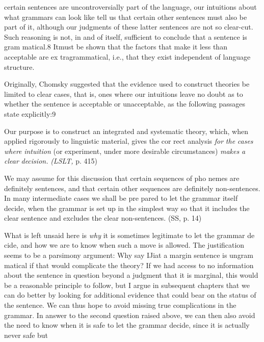 \clearpage\setcounter{page}{1}\begin{styleStandard}
certain sentences are uncontroversially part of the language, our intuitions about what grammars can look like tell us that certain other sentences must also be part of it, although our judgments of these latter sentences are not so clear-cut. Such reasoning is not, in and of itself, sufficient to conclude that a sentence is gram\- matical.8 Itmust be shown that the factors that make it less than acceptable are ex\- tragrammatical, i.e., that they exist independent of language structure.
\end{styleStandard}


\begin{styleStandard}
Originally, Chomsky suggested that the evidence used to construct theories be limited to clear cases, that is, ones where our intuitions leave no doubt as to whether the sentence is acceptable or unacceptable, as the following passages state explicitly:9
\end{styleStandard}


\begin{styleStandard}
Our purpose is to construct an integrated and systematic theory, which, when applied rigorously to linguistic material, gives the cor\- rect analysis \textit{for}\textit{ }\textit{the}\textit{ }\textit{cases}\textit{ }\textit{where}\textit{ }\textit{intuition}\textit{ }(or experiment, under more desirable circumstances) \textit{makes}\textit{ }\textit{a}\textit{ }\textit{clear}\textit{ }\textit{decision.}\textit{ }\textit{(LSLT,}\textit{ }p. 415)
\end{styleStandard}


\begin{styleStandard}
We may assume for this discussion that certain sequences of pho\- nemes are definitely sentences, and that certain other sequences are definitely non-sentences. In many intermediate cases we shall be pre\- pared to let the grammar itself decide, when the grammar is set up in the simplest way so that it includes the clear sentence and excludes the clear non-sentences. (SS, p. 14)
\end{styleStandard}


\begin{styleStandard}
What is left unsaid here is \textit{why}\textit{ }it is sometimes legitimate to let the grammar de\- cide, and how we are to know when such a move is allowed. The justification seems to be a parsimony argument: Why say IJiat a margin sentence is ungram\- matical if that would complicate the theory? If we had access to no information about the sentence in question beyond a judgment that it is marginal, this would be a reasonable principle to follow, but I argue in subsequent chapters that we can do better by looking for additional evidence that could bear on the status of the sentence. We can thus hope to avoid missing true complications in the grammar. In answer to the second question raised above, we can then also avoid the need to know when it is safe to let the grammar decide, since it is actually never safe but
\end{styleStandard}


